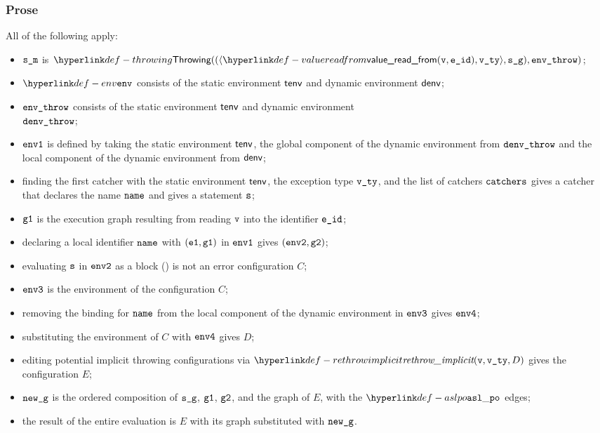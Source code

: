 \subsubsection{Prose}
All of the following apply:
\begin{itemize}
  \item $\texttt{s\_m}$ is $\Throwing((\langle \valuereadfrom(\vv, \eid), \vvty \rangle, \sg), \envthrow)$;
  \item $\env$ consists of the static environment $\textsf{tenv}$ and dynamic environment $\textsf{denv}$;
  \item $\texttt{env\_throw}$ consists of the static environment $\textsf{tenv}$ and dynamic environment \\ $\texttt{denv\_throw}$;
  \item $\texttt{env1}$ is defined by taking the static environment $\textsf{tenv}$, the global component of the dynamic
  environment from $\texttt{denv\_throw}$ and the local component of the dynamic environment from $\textsf{denv}$;
  \item finding the first catcher with the static environment $\textsf{tenv}$, the exception type $\texttt{v\_ty}$,
  and the list of catchers $\texttt{catchers}$ gives a catcher that declares the name $\texttt{name}$ and gives a statement $\texttt{s}$;
  \item $\texttt{g1}$ is the execution graph resulting from reading $\texttt{v}$ into the identifier $\texttt{e\_id}$;
  \item declaring a local identifier $\texttt{name}$ with $(\texttt{e1}, \texttt{g1})$ in $\texttt{env1}$ gives $(\texttt{env2}, \texttt{g2})$;
  \item evaluating $\texttt{s}$ in $\texttt{env2}$ as a block () is not an error
  configuration $C$\ProseOrError;
  \item $\texttt{env3}$ is the environment of the configuration $C$;
  \item removing the binding for $\texttt{name}$ from the local component of the dynamic environment in $\texttt{env3}$
  gives $\texttt{env4}$;
  \item substituting the environment of $C$ with $\texttt{env4}$ gives $D$;
  \item editing potential implicit throwing configurations via $\rethrowimplicit(\vv, \vvty, D)$
  gives the configuration $E$;
  \item $\texttt{new\_g}$ is the ordered composition of $\texttt{s\_g}$, $\texttt{g1}$, $\texttt{g2}$, and the graph of $E$,
  with the $\aslpo$ edges;
  \item the result of the entire evaluation is $E$ with its graph substituted with $\texttt{new\_g}$.
\end{itemize}
